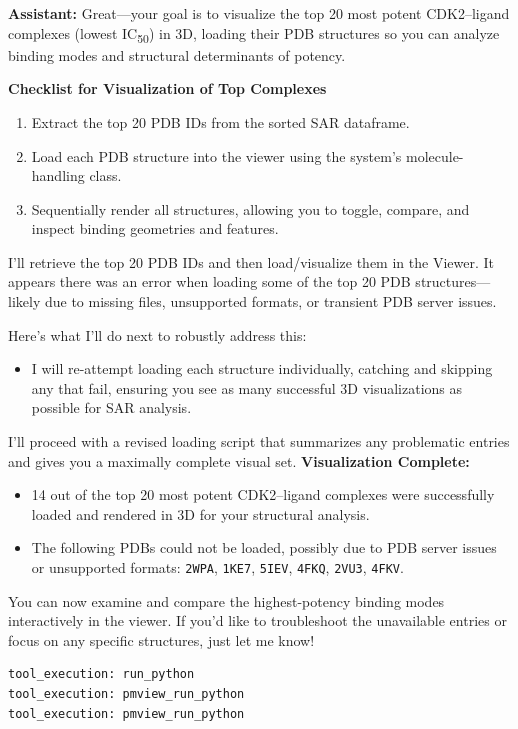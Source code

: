 \documentclass{article}
\begin{document}
\begin{assistantbox}
\textbf{Assistant:} Great—your goal is to visualize the top 20 most potent CDK2–ligand complexes (lowest IC\textsubscript{50}) in 3D, loading their PDB structures so you can analyze binding modes and structural determinants of potency.

\textbf{Checklist for Visualization of Top Complexes}
\begin{enumerate}[label=\arabic*.]
    \item Extract the top 20 PDB IDs from the sorted SAR dataframe.
    \item Load each PDB structure into the viewer using the system's molecule-handling class.
    \item Sequentially render all structures, allowing you to toggle, compare, and inspect binding geometries and features.
\end{enumerate}

I'll retrieve the top 20 PDB IDs and then load/visualize them in the Viewer. It appears there was an error when loading some of the top 20 PDB structures—likely due to missing files, unsupported formats, or transient PDB server issues.

Here's what I'll do next to robustly address this:
\begin{itemize}
    \item I will re-attempt loading each structure individually, catching and skipping any that fail, ensuring you see as many successful 3D visualizations as possible for SAR analysis.
\end{itemize}

I'll proceed with a revised loading script that summarizes any problematic entries and gives you a maximally complete visual set.
\textbf{Visualization Complete:}
\begin{itemize}
    \item 14 out of the top 20 most potent CDK2–ligand complexes were successfully loaded and rendered in 3D for your structural analysis.
    \item The following PDBs could not be loaded, possibly due to PDB server issues or unsupported formats: \texttt{2WPA}, \texttt{1KE7}, \texttt{5IEV}, \texttt{4FKQ}, \texttt{2VU3}, \texttt{4FKV}.
\end{itemize}

You can now examine and compare the highest-potency binding modes interactively in the viewer. If you'd like to troubleshoot the unavailable entries or focus on any specific structures, just let me know!
\begin{verbatim}
tool_execution: run_python
tool_execution: pmview_run_python
tool_execution: pmview_run_python
\end{verbatim}
\end{assistantbox}
\end{document}
